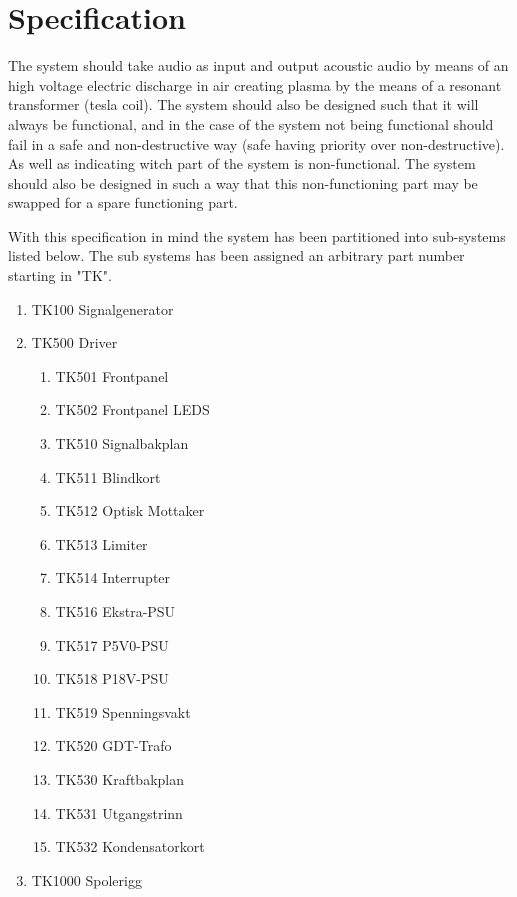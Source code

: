 \section{Specification}
The system should take audio as input and output acoustic audio by means of an high voltage electric discharge in air creating plasma by the means of a resonant transformer (tesla coil). The system should also be designed such that it will always be functional, and in the case of the system not being functional should fail in a safe and non-destructive way (safe having priority over non-destructive). As well as indicating witch part of the system is non-functional. The system should also be designed in such a way that this non-functioning part may be swapped for a spare functioning part.






With this specification in mind the system has been partitioned into sub-systems listed below. The sub systems has been assigned an arbitrary part number starting in "TK".

\begin{enumerate}
    \item TK100 Signalgenerator
    \item TK500 Driver
    \begin{enumerate}
        \item TK501 Frontpanel
        \item TK502 Frontpanel LEDS
        \item TK510 Signalbakplan
        \item TK511 Blindkort
        \item TK512 Optisk Mottaker
        \item TK513 Limiter
        \item TK514 Interrupter
        \item TK516 Ekstra-PSU
        \item TK517 P5V0-PSU
        \item TK518 P18V-PSU
        \item TK519 Spenningsvakt
        \item TK520 GDT-Trafo
        \item TK530 Kraftbakplan
        \item TK531 Utgangstrinn
        \item TK532 Kondensatorkort
    \end{enumerate}
    \item TK1000 Spolerigg
\end{enumerate}

